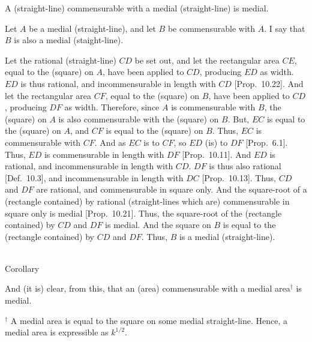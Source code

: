 \begin{Parallel}{}{}
{A (straight-line) commensurable with
a medial (straight-line) is medial.

Let $A$ be a medial (straight-line), and let $B$ be commensurable with $A$.
I say that $B$ is also a medial (staight-line).

Let the rational (straight-line) $CD$ be set out, and let the rectangular
area $CE$, equal to the (square) on $A$, have been applied to $CD$,
producing $ED$ as width. $ED$ is thus rational, and incommensurable
in length with $CD$ [Prop.~10.22]. And
let the rectangular area $CF$, equal to the (square) on $B$, have been
applied to $CD$, producing $DF$ as width.
Therefore, since $A$ is commensurable with $B$, the (square) on $A$
is also commensurable with the (square) on $B$.  But, $EC$ is equal
to the (square) on $A$, and $CF$ is equal to the (square) on $B$. Thus,
$EC$ is commensurable with $CF$. And as $EC$ is to $CF$, so $ED$ (is)
to $DF$ [Prop.~6.1]. Thus, $ED$ is commensurable
in  length with $DF$ [Prop.~10.11]. And $ED$
is rational, and incommensurable in length with $CD$.  $DF$ is thus
 also rational [Def.~10.3], and incommensurable in length with $DC$  [Prop.~10.13]. Thus,
 $CD$ and $DF$ are rational, and commensurable in square only.
 And the square-root of a (rectangle contained) by rational (straight-lines which are)
 commensurable in square only is medial [Prop.~10.21]. Thus, the square-root of the
 (rectangle contained) by $CD$ and $DF$ is medial.
 And the square on $B$ is equal to
 the (rectangle contained) by $CD$ and $DF$. Thus, $B$ is a medial (straight-line).
 
\epsfysize=2.1in
\centerline{}
 
\begin{center}~\\
 {\large Corollary}
 \end{center}\vspace*{-7pt}
 
 And (it is) clear, from this, that an (area) commensurable with a medial 
 area$^\dag$ is medial.}
\end{Parallel}
{\footnotesize\noindent$^\dag$ A medial area is equal to the square on some medial straight-line. Hence, a medial area is expressible as $k^{1/2}$.}
 
